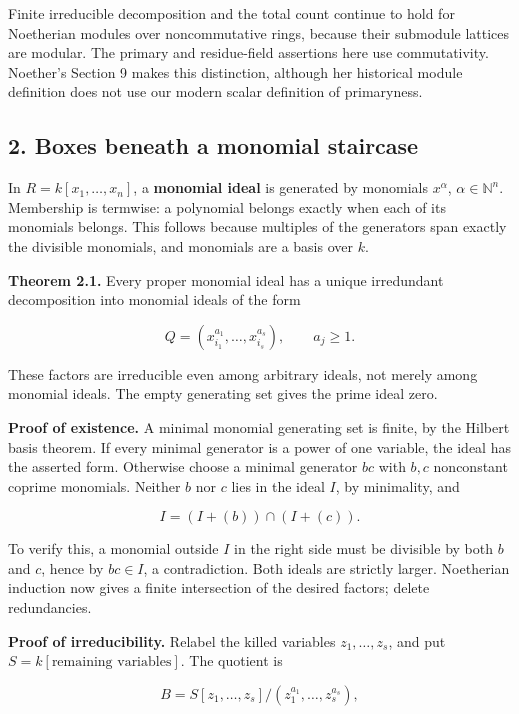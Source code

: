 \documentclass[
]{article}
\begin{document}
Finite irreducible decomposition and the total count continue to hold
for Noetherian modules over noncommutative rings, because their
submodule lattices are modular. The primary and residue-field assertions
here use commutativity. Noether's Section 9 makes this distinction,
although her historical module definition does not use our modern scalar
definition of primaryness.

\subsection{2. Boxes beneath a monomial
staircase}\label{boxes-beneath-a-monomial-staircase}

In \(R=k[x_1,\ldots,x_n]\), a \textbf{monomial ideal} is generated by
monomials \(x^\alpha\), \(\alpha\in\mathbb N^n\). Membership is
termwise: a polynomial belongs exactly when each of its monomials
belongs. This follows because multiples of the generators span exactly
the divisible monomials, and monomials are a basis over \(k\).

\textbf{Theorem 2.1.} Every proper monomial ideal has a unique
irredundant decomposition into monomial ideals of the form

\[
Q=(x_{i_1}^{a_1},\ldots,x_{i_s}^{a_s}),\qquad a_j\ge1.
\]

These factors are irreducible even among arbitrary ideals, not merely
among monomial ideals. The empty generating set gives the prime ideal
zero.

\textbf{Proof of existence.} A minimal monomial generating set is
finite, by the Hilbert basis theorem. If every minimal generator is a
power of one variable, the ideal has the asserted form. Otherwise choose
a minimal generator \(bc\) with \(b,c\) nonconstant coprime monomials.
Neither \(b\) nor \(c\) lies in the ideal \(I\), by minimality, and

\[
I=(I+(b))\cap(I+(c)).
\]

To verify this, a monomial outside \(I\) in the right side must be
divisible by both \(b\) and \(c\), hence by \(bc\in I\), a
contradiction. Both ideals are strictly larger. Noetherian induction now
gives a finite intersection of the desired factors; delete redundancies.

\textbf{Proof of irreducibility.} Relabel the killed variables
\(z_1,\ldots,z_s\), and put \(S=k[\text{remaining variables}]\). The
quotient is

\[
B=S[z_1,\ldots,z_s]/(z_1^{a_1},\ldots,z_s^{a_s}),
\]
\end{document}
